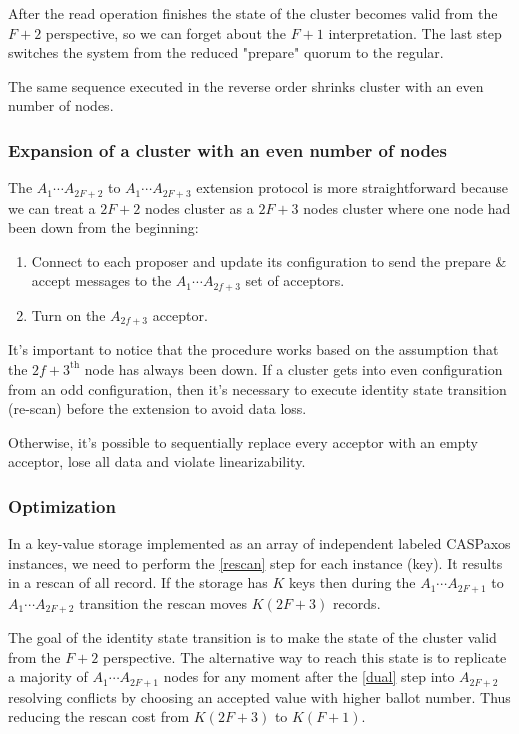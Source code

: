 \documentclass[a4paper,USenglish]{lipics-v2018}
\theoremstyle{definition}
\begin{document}
    After the read operation finishes the state of the cluster becomes valid from the $F+2$ perspective, so we can forget about the $F+1$ interpretation. The last step switches the system from the reduced "prepare" quorum to the regular.

    The same sequence executed in the reverse order shrinks cluster with an even number of nodes.

\subsubsection{Expansion of a cluster with an even number of nodes}

    The $A_1 \cdots A_{2F+2}$ to $A_1 \cdots A_{2F+3}$ extension protocol is more straightforward because we can treat a $2F+2$ nodes cluster as a $2F+3$ nodes cluster where one node had been down from the beginning:
    \begin{enumerate}
        \item Connect to each proposer and update its configuration to send the prepare \& accept messages to the $A_1 \cdots A_{2f+3}$ set of acceptors.

        \item Turn on the $A_{2f+3}$ acceptor.
    \end{enumerate}

    It's important to notice that the procedure works based on the assumption that the $2f+3^{\mbox{th}}$ node has always been down. If a cluster gets into even configuration from an odd configuration, then it's necessary to execute identity state transition (re-scan) before the extension to avoid data loss. 

    Otherwise, it's possible to sequentially replace every acceptor with an empty acceptor, lose all data and violate linearizability.

\subsubsection{Optimization}

    In a key-value storage implemented as an array of independent labeled CASPaxos instances, we need to perform the \ref{rescan} step for each instance (key). It results in a rescan of all record. If the storage has $K$ keys then during the $A_1 \cdots A_{2F+1}$ to $A_1 \cdots A_{2F+2}$ transition the rescan moves $K(2F+3)$ records.

    The goal of the identity state transition is to make the state of the cluster valid from the $F+2$ perspective. The alternative way to reach this state is to replicate a majority of $A_1 \cdots A_{2F+1}$ nodes for any moment after the \ref{dual} step into $A_{2F+2}$ resolving conflicts by choosing an accepted value with higher ballot number. Thus reducing the rescan cost from $K(2F+3)$ to $K(F+1)$.
\end{document}
